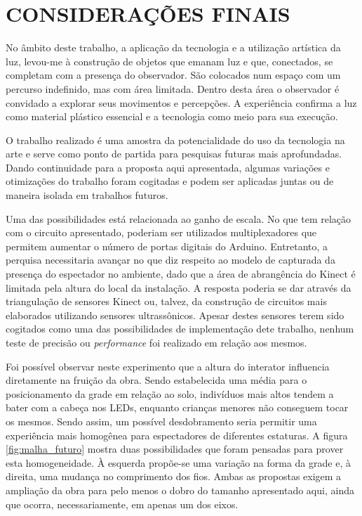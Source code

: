 \chapter{CONSIDERAÇÕES FINAIS}

No âmbito deste trabalho, a aplicação da tecnologia e a utilização artística da luz, levou-me à construção de objetos que emanam luz e que, conectados, se completam com a presença do observador. São colocados num espaço com um percurso indefinido, mas com área limitada. Dentro desta área o observador é convidado a explorar seus movimentos e percepções. A experiência confirma a luz como material plástico essencial e a tecnologia como meio para sua execução.

O trabalho realizado é uma amostra da potencialidade do uso da tecnologia na arte e serve como ponto de partida para pesquisas futuras mais aprofundadas. Dando continuidade para a proposta aqui apresentada, algumas variações e otimizações do trabalho foram cogitadas e podem ser aplicadas juntas ou de maneira isolada em trabalhos futuros.

Uma das possibilidades está relacionada ao ganho de escala. No que tem relação com o circuito apresentado, poderiam ser utilizados multiplexadores que permitem aumentar o número de portas digitais do Arduino. Entretanto, a perquisa necessitaria avançar no que diz respeito ao modelo de capturada da presença do espectador no ambiente, dado que a área de abrangência do Kinect é limitada pela altura do local da instalação. A resposta poderia se dar através da triangulação de sensores Kinect ou, talvez, da construção de circuitos mais elaborados utilizando sensores ultrassônicos. Apesar destes sensores terem sido cogitados como uma das possibilidades de implementação dete trabalho, nenhum teste de precisão ou \textit{performance} foi realizado em relação aos mesmos.

Foi possível observar neste experimento que a altura do interator influencia diretamente na fruição da obra. Sendo estabelecida uma média para o posicionamento da grade em relação ao solo, indivíduos mais altos tendem a bater com a cabeça nos LEDs, enquanto crianças menores não conseguem tocar os mesmos. Sendo assim, um possível desdobramento seria permitir uma experiência mais homogênea para espectadores de diferentes estaturas. A figura \ref{fig:malha_futuro} mostra duas possibilidades que foram pensadas para prover esta homogeneidade. À esquerda propõe-se uma variação na forma da grade e, à direita, uma mudança no comprimento dos fios. Ambas as propostas exigem a ampliação da obra para pelo menos o dobro do tamanho apresentado aqui, ainda que ocorra, necessariamente, em apenas um dos eixos. 

